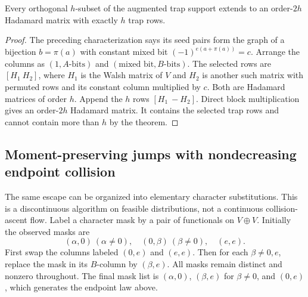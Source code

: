 \begin{proposition}
\label{prop:compression-complete-clique}
Every orthogonal $h$-subset of the augmented trap support extends to an
order-$2h$ Hadamard matrix with exactly $h$ trap rows.
\end{proposition}
\begin{proof}
The preceding characterization says its seed pairs form the graph of a
bijection $b=\pi(a)$ with constant mixed bit $(-1)^{e(a+\pi(a))}=c$.
Arrange the columns as $(1,A\text{-bits})$ and
$(\text{mixed bit},B\text{-bits})$. The selected rows are
$[H_1\ H_2]$, where $H_1$ is the Walsh matrix of $V$ and $H_2$ is
another such matrix with permuted rows and its constant column multiplied
by $c$. Both are Hadamard matrices of order $h$. Append the $h$ rows
$[H_1\ -H_2]$. Direct block multiplication gives an order-$2h$ Hadamard
matrix. It contains the selected trap rows and cannot contain more than
$h$ by the theorem.
\end{proof}

\subsection{Moment-preserving jumps with nondecreasing endpoint collision}
The same escape can be organized into elementary character substitutions.
This is a discontinuous algorithm on feasible distributions, not a
continuous collision-ascent flow. Label a character mask by a pair of
functionals on $V\oplus V$. Initially the observed masks are
\[
 (\alpha,0)\ (\alpha\ne0),\quad (0,\beta)\ (\beta\ne0),\quad(e,e).
\]
First swap the columns labeled $(0,e)$ and $(e,e)$. Then for each
$\beta\ne0,e$, replace the mask in its $B$-column by $(\beta,e)$.
All masks remain distinct and nonzero throughout. The final mask list is
$(\alpha,0)$, $(\beta,e)$ for $\beta\ne0$, and $(0,e)$, which generates
the endpoint law above.

